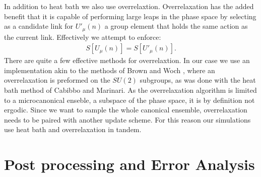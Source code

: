 \documentclass[english,twoside,openright]{UH_TCM_MSc}
\begin{document}
In addition to heat bath we also use overrelaxtion. Overrelaxation has the added benefit that it is capable of performing large leaps in the phase space by selecting as a candidate link for $U'_\mu(n)$ a group element that holds the same action as the current link. Effectively we attempt to enforce:
\begin{align}
    S[U_\mu(n)] = S[U'_\mu(n)].
\end{align}
There are quite a few effective methods for overrelaxtion. In our case we use an implementation akin to the methods of Brown and Woch \cite{Brown}, where an overrelaxation is preformed on the $SU(2)$ subgroups, as was done with the heat bath method of Cabibbo and Marinari. As the overrelaxation algorithm is limited to a microcanonical enseble, a subspace of the phase space, it is by definition not ergodic. Since we want to sample the whole canonical ensemble, overrelaxation needs to be paired with another update scheme. For this reason our simulations use heat bath and overrelaxation in tandem. 

\section{Post processing and Error Analysis}
\end{document}
